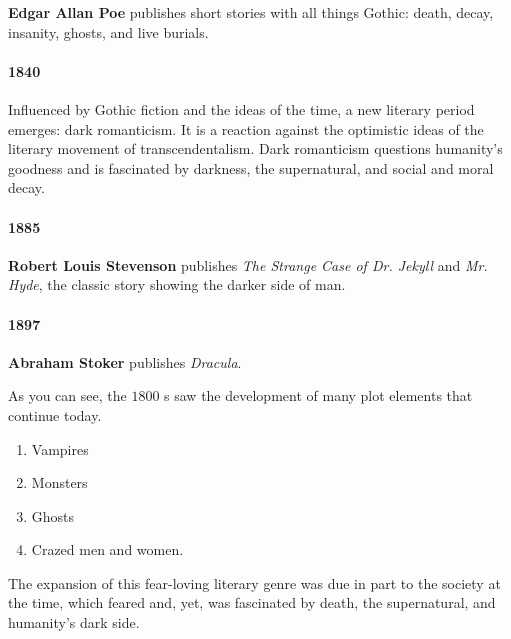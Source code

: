 \textbf{Edgar Allan Poe} publishes short stories with all things Gothic: death,
decay, insanity, ghosts, and live burials.


\paragraph{1840}
\label{par:1840}

Influenced by Gothic fiction and the ideas of the time, a new literary period
emerges: dark romanticism. It is a reaction against the optimistic ideas of the
literary movement of transcendentalism. Dark romanticism questions humanity's
goodness and is fascinated by darkness, the supernatural, and social and moral
decay.


\paragraph{1885}
\label{par:1885}

\textbf{Robert Louis Stevenson} publishes \textit{The Strange Case of Dr.
Jekyll} and \textit{Mr. Hyde}, the classic story showing the darker side of man.


\paragraph{1897}
\label{par:1897}

\textbf{Abraham Stoker} publishes \textit{Dracula}.


As you can see, the $1800$ s saw the development of many plot elements that
continue today.

\begin{enumerate}
  \label{enum:plot_elements_that_continue_today}

  \item Vampires
  \item Monsters
  \item Ghosts
  \item Crazed men and women.
\end{enumerate}

The expansion of this fear-loving literary genre was due in part to the society
at the time, which feared and, yet, was fascinated by death, the supernatural,
and humanity's dark side.

